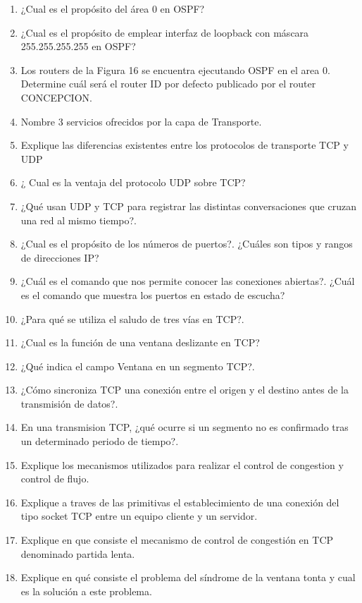 \documentclass{udparticle}
\begin{document}
\begin{enumerate}
\item ¿Cual es el propósito del área 0 en OSPF?
\item ¿Cual es el propósito de emplear interfaz de loopback con máscara 255.255.255.255 en OSPF?
\item Los routers de la Figura 16 se encuentra ejecutando OSPF en el area 0. 
Determine cuál será el router ID por defecto publicado por el router CONCEPCION.
\item Nombre 3 servicios ofrecidos por la capa de Transporte.
\item Explique las diferencias existentes entre los protocolos de transporte TCP y UDP
\item ¿ Cual es la ventaja del protocolo UDP sobre TCP?
\item ¿Qué usan UDP y TCP para registrar las distintas conversaciones que cruzan una red al mismo tiempo?.
\item ¿Cual es el propósito de los números de puertos?. ¿Cuáles son tipos y rangos de direcciones IP?
\item ¿Cuál es el comando que nos permite conocer las conexiones abiertas?. 
¿Cuál es el comando que muestra los puertos en estado de escucha?
\item ¿Para qué se utiliza el saludo de tres vías en TCP?.
\item ¿Cual es la función de una ventana deslizante en TCP?
\item ¿Qué indica el campo Ventana en un segmento TCP?.
\item ¿Cómo sincroniza TCP una conexión entre el origen y el destino antes de la 
transmisión de datos?.
\item En una transmision TCP, ¿qué ocurre si un segmento no es confirmado tras un 
determinado periodo de tiempo?.
\item Explique los mecanismos utilizados para realizar el control de congestion y control de flujo.
\item Explique a traves de las primitivas el establecimiento de una conexión del
tipo socket TCP entre un equipo cliente y un servidor.
\item Explique en que consiste el mecanismo de control de congestión en TCP denominado partida lenta.
\item Explique en qué consiste el problema del síndrome de la ventana tonta y cual es la solución a este problema.


\end{enumerate}
\end{document}
